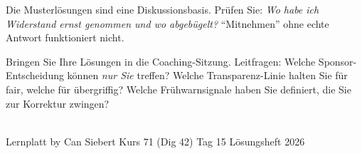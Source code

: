 \documentclass[11pt,a4paper,oneside]{article}
\begin{document}
\noindent Die Musterl\"osungen sind eine Diskussionsbasis. Pr\"ufen Sie: \emph{Wo habe ich Widerstand ernst genommen \textendash{} und wo abgeb\"ugelt?} ``Mitnehmen'' ohne echte Antwort funktioniert nicht.

\medskip
\begin{infobox}
Bringen Sie Ihre L\"osungen in die Coaching-Sitzung. Leitfragen: Welche Sponsor-Entscheidung k\"onnen \emph{nur Sie} treffen? Welche Transparenz-Linie halten Sie f\"ur fair, welche f\"ur \"ubergriffig? Welche Fr\"uhwarnsignale haben Sie definiert, die Sie zur Korrektur zwingen?
\end{infobox}

\vspace{1cm}
\noindent{\color{lpAccent}\rule{\linewidth}{0.6pt}}\\[4pt]
{\footnotesize\sffamily\color{lpGray}Lernplatt \textperiodcentered{} by Can Siebert \textperiodcentered{} Kurs 71 (Dig 42) \textperiodcentered{} Tag 15 \textperiodcentered{} L\"osungsheft \textperiodcentered{} \textcopyright{} 2026}
\end{document}
